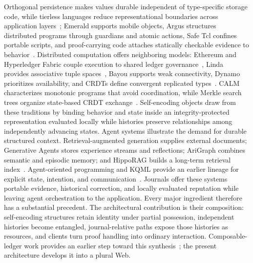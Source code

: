 Orthogonal persistence makes values durable independent of type-specific storage code, while tierless languages reduce representational boundaries across application layers~\cite{Atkinson1983approach,Cooper2007links}; Emerald supports mobile objects, Argus structures distributed programs through guardians and atomic actions, Safe Tcl confines portable scripts, and proof-carrying code attaches statically checkable evidence to behavior~\cite{Raj1991emerald,Liskov1988distributed,Levy1995safe,Necula1997proof}. Distributed computation offers neighboring models: Ethereum and Hyperledger Fabric couple execution to shared ledger governance~\cite{Wood2014ethereum,Androulaki2018hyperledger}, Linda provides associative tuple spaces~\cite{Gelernter1985generative}, Bayou supports weak connectivity, Dynamo prioritizes availability, and CRDTs define convergent replicated types~\cite{Terry1995managing,DeCandia2007dynamo,Shapiro2011conflict}. CALM characterizes monotonic programs that avoid coordination, while Merkle search trees organize state-based CRDT exchange~\cite{Hellerstein2020keeping,Auvolat2019merkle}. Self-encoding objects draw from these traditions by binding behavior and state inside an integrity-protected representation evaluated locally while histories preserve relationships among independently advancing states. Agent systems illustrate the demand for durable structured context. Retrieval-augmented generation supplies external documents; Generative Agents stores experience streams and reflections; AriGraph combines semantic and episodic memory; and HippoRAG builds a long-term retrieval index~\cite{Lewis2020retrieval,Park2023generative,Anokhin2025arigraph,Gu2024hipporag}. Agent-oriented programming and KQML provide an earlier lineage for explicit state, intention, and communication~\cite{Shoham1993agent,Finin1994kqml}. Journals offer these systems portable evidence, historical correction, and locally evaluated reputation while leaving agent orchestration to the application. Every major ingredient therefore has a substantial precedent. The architectural contribution is their composition: self-encoding structures retain identity under partial possession, independent histories become entangled, journal-relative paths expose those histories as resources, and clients turn proof handling into ordinary interaction. Composable-ledger work provides an earlier step toward this synthesis~\cite{dinh2023composable}; the present architecture develops it into a plural Web.